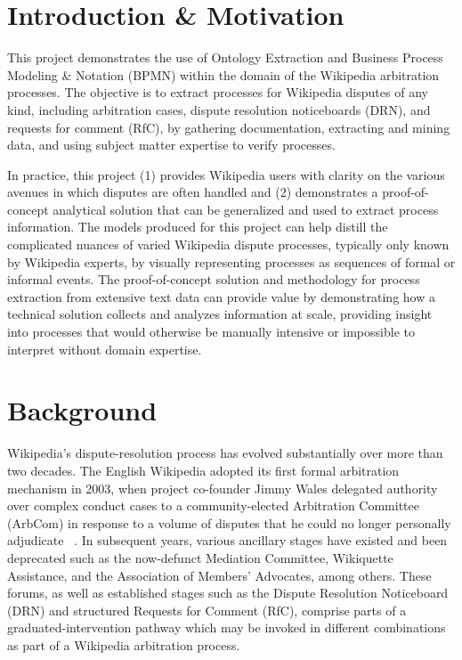 \documentclass[conference]{IEEEtran}
\begin{document}
\section{Introduction \& Motivation}
This project demonstrates the use of Ontology Extraction and Business Process Modeling \& Notation (BPMN) within the domain of the Wikipedia arbitration processes. The objective is to extract processes for Wikipedia disputes of any kind, including arbitration cases, dispute resolution noticeboards (DRN), and requests for comment (RfC), by gathering documentation, extracting and mining data, and using subject matter expertise to verify processes.

In practice, this project (1) provides Wikipedia users with clarity on the various avenues in which disputes are often handled and (2) demonstrates a proof-of-concept analytical solution that can be generalized and used to extract process information. The models produced for this project can help distill the complicated nuances of varied Wikipedia dispute processes, typically only known by Wikipedia experts, by visually representing processes as sequences of formal or informal events. The proof-of-concept solution and methodology for process extraction from extensive text data can provide value by demonstrating how a technical solution collects and analyzes information at scale, providing insight into processes that would otherwise be manually intensive or impossible to interpret without domain expertise.

\section{Background}

Wikipedia's dispute-resolution process has evolved substantially over more than two decades. The English Wikipedia adopted its first formal arbitration mechanism in 2003, when project co-founder Jimmy Wales delegated authority over complex conduct cases to a community-elected Arbitration Committee (ArbCom) in response to a volume of disputes that he could no longer personally adjudicate ~\cite{b1}. In subsequent years, various ancillary stages have existed and been deprecated such as the now-defunct Mediation Committee, Wikiquette Assistance, and the Association of Members' Advocates, among others. These forums, as well as established stages such as the Dispute Resolution Noticeboard (DRN) and structured Requests for Comment (RfC), comprise parts of a graduated-intervention pathway which may be invoked in different combinations as part of a Wikipedia arbitration process\cite{b2, b3}.
\end{document}
